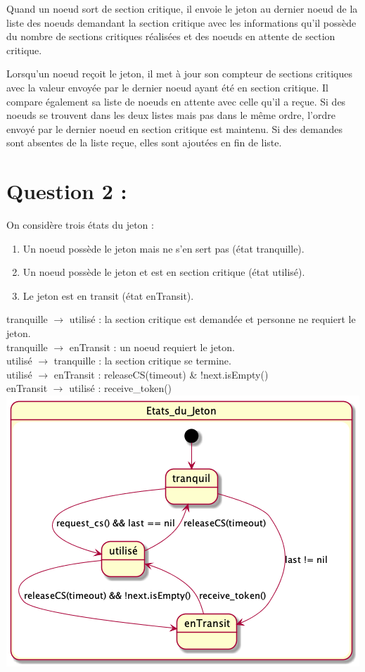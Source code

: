 \documentclass[11pt,a4paper]{report}
\begin{document}
Quand un noeud sort de section critique, il envoie le jeton au dernier noeud de la liste des noeuds demandant la section critique avec les informations qu'il possède du nombre de sections critiques réalisées et des noeuds en attente de section critique.

Lorsqu'un noeud reçoit le jeton, il met à jour son compteur de sections critiques avec la valeur envoyée par le dernier noeud ayant été en section critique. Il compare également sa liste de noeuds en attente avec celle qu'il a reçue. Si des noeuds se trouvent dans les deux listes mais pas dans le même ordre, l'ordre envoyé par le dernier noeud en section critique est maintenu. Si des demandes sont absentes de la liste reçue, elles sont ajoutées en fin de liste.


\section{Question 2 :}

On considère trois états du jeton :
\begin{enumerate}
	\item Un noeud possède le jeton mais ne s’en sert pas (état tranquille).
	\item Un noeud possède le jeton et est en section critique (état utilisé).
	\item Le jeton est en transit (état enTransit).
\end{enumerate}
tranquille $\rightarrow$ utilisé : la section critique est demandée et personne ne requiert le jeton.\\
tranquille $\rightarrow$ enTransit : un noeud requiert le jeton.\\
utilisé $\rightarrow$ tranquille : la section critique se termine.\\
utilisé $\rightarrow$ enTransit : releaseCS(timeout) \& !next.isEmpty()\\
enTransit $\rightarrow$ utilisé : receive\_token()\\

\includegraphics[scale=0.3]{../Diagrammes/exercice_1-question_2.png}
\end{document}
